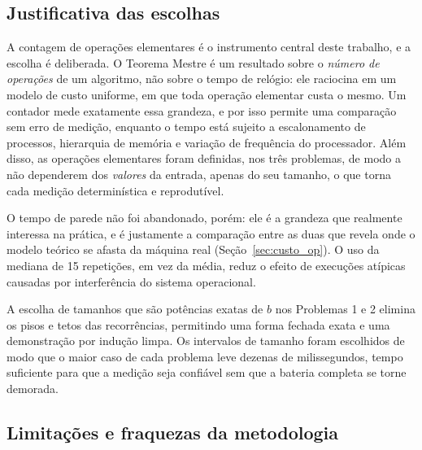 \documentclass[11pt,a4paper]{article}
\begin{document}
\subsection{Justificativa das escolhas}

A contagem de operações elementares é o instrumento central deste trabalho, e a escolha é deliberada. O Teorema Mestre é um resultado sobre o \emph{número de operações} de um algoritmo, não sobre o tempo de relógio: ele raciocina em um modelo de custo uniforme, em que toda operação elementar custa o mesmo. Um contador mede exatamente essa grandeza, e por isso permite uma comparação sem erro de medição, enquanto o tempo está sujeito a escalonamento de processos, hierarquia de memória e variação de frequência do processador. Além disso, as operações elementares foram definidas, nos três problemas, de modo a não dependerem dos \emph{valores} da entrada, apenas do seu tamanho, o que torna cada medição determinística e reprodutível.

O tempo de parede não foi abandonado, porém: ele é a grandeza que realmente interessa na prática, e é justamente a comparação entre as duas que revela onde o modelo teórico se afasta da máquina real (Seção~\ref{sec:custo_op}). O uso da mediana de 15 repetições, em vez da média, reduz o efeito de execuções atípicas causadas por interferência do sistema operacional.

A escolha de tamanhos que são potências exatas de $b$ nos Problemas 1 e 2 elimina os pisos e tetos das recorrências, permitindo uma forma fechada exata e uma demonstração por indução limpa. Os intervalos de tamanho foram escolhidos de modo que o maior caso de cada problema leve dezenas de milissegundos, tempo suficiente para que a medição seja confiável sem que a bateria completa se torne demorada.

\subsection{Limitações e fraquezas da metodologia}
\end{document}
